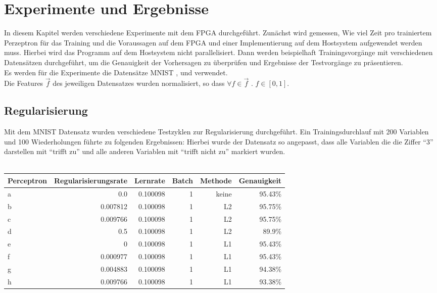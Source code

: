 \chapter{Experimente und Ergebnisse}
In diesem Kapitel werden verschiedene Experimente mit dem FPGA durchgeführt. Zunächst wird gemessen, Wie viel Zeit pro trainiertem Perzeptron für das Training und die Voraussagen auf dem FPGA und einer Implementierung auf dem Hostsystem aufgewendet werden muss. Hierbei wird das Programm auf dem Hostsystem nicht parallelisiert. 
Dann werden beispielhaft Trainingsvorgänge mit verschiedenen Datensätzen durchgeführt, um die Genauigkeit der Vorhersagen zu überprüfen und Ergebnisse der Testvorgänge zu präsentieren.\\
Es werden für die Experimente die Datensätze MNIST \cite{MNIST}, und verwendet.\\
Die Features $\vec f$ des jeweiligen Datensatzes wurden normalisiert, so dass $\forall f \in \vec f\text{ . } f \in [0,1]$. 
\section{Regularisierung}
Mit dem MNIST Datensatz wurden verschiedene Testzyklen zur Regularisierung durchgeführt. Ein Trainingsdurchlauf mit 200 Variablen und 100 Wiederholungen führte zu folgenden Ergebnissen: Hierbei wurde der Datensatz so angepasst, dass alle Variablen die die Ziffer "`3"' darstellen mit "`trifft zu"' und alle anderen Variablen mit "`trifft nicht zu"' markiert wurden.\\\\
\begin{tabularx}{\textwidth}{p{}|r|r|r|r|r}
Perceptron & Regularisierungsrate & Lernrate & Batch & Methode & Genauigkeit\\
\hline
a & 0.0 & 0.100098 & 1 & keine & 95.43\%\\
\hline
b & 0.007812 & 0.100098 & 1 & L2 & 95.75\%\\
\hline
c & 0.009766 & 0.100098 & 1 & L2 & 95.75\%\\
\hline
d & 0.5 & 0.100098 & 1 & L2 & 89.9\%\\
\hline
e & 0 & 0.100098 & 1 & L1 & 95.43\%\\
\hline
f & 0.000977 & 0.100098 & 1 & L1 & 95.43\%\\
\hline
g & 0.004883 & 0.100098 & 1 & L1 & 94.38\%\\
\hline
h & 0.009766 & 0.100098 & 1 & L1 & 93.38\%\\
\end{tabularx}

